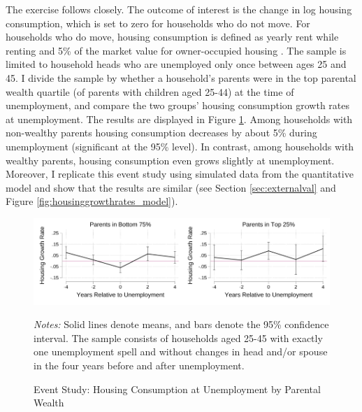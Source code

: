 \documentclass[12pt]{article}
\begin{document}
The exercise follows \cite{Chetty2007} closely. The outcome of interest is the change in log housing consumption, which is set to zero for households who do not move. For households who do move, housing consumption is defined as yearly rent while renting and 5\% of the market value for owner-occupied housing \citep{Davis2008}. The sample is limited to household heads who are unemployed only once between ages 25 and 45. I divide the sample by whether a household's parents were in the top parental wealth quartile (of parents with children aged 25-44) at the time of unemployment, and compare the two groups' housing consumption growth rates at unemployment. The results are displayed in Figure \ref{fig:housinggrowthrates}. Among households with non-wealthy parents housing consumption decreases by about 5\% during unemployment (significant at the 95\% level). In contrast, among households with wealthy parents, housing consumption even grows slightly at unemployment. Moreover, I replicate this event study using simulated data from the quantitative model and show that the results are similar (see Section \ref{sec:externalval} and Figure \ref{fig:housinggrowthrates_model}).
\begin{figure}
	\caption{Event Study: Housing Consumption at Unemployment by Parental Wealth}\label{fig:housinggrowthrates}
	\noindent\includegraphics[width=0.5\textwidth]{../tabfig/descr/PSID_housinggrowthpoor_both}\includegraphics[width=0.5\textwidth]{../tabfig/descr/PSID_housinggrowthrich_both}

	{\begin{footnotesize} \textit{Notes:} Solid lines denote means, and bars denote the 95\% confidence interval. The sample consists of households aged 25-45 with exactly one unemployment spell and without changes in head and/or spouse in the four years before and after unemployment. \end{footnotesize}}
\end{figure}
\end{document}
